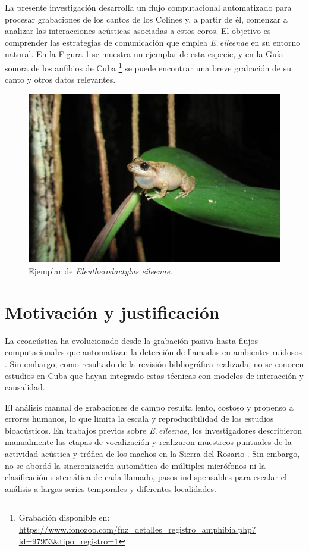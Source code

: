 La presente investigación desarrolla un flujo computacional automatizado para 
procesar grabaciones de los cantos de los Colines y, a partir de él, comenzar a analizar 
 las interacciones acústicas asociadas a estos coros. 
El objetivo es comprender las 
estrategias de comunicación que emplea \emph{E.\,eileenae} en su entorno natural.
En la Figura \ref{fig:colin} se muestra un ejemplar de esta especie, y en la
Guía sonora de los anfibios de Cuba 
\footnote{Grabación disponible en: \url{https://www.fonozoo.com/fnz_detalles_registro_amphibia.php?id=97953&tipo_registro=1}}
se puede encontrar una breve grabación de su canto y otros datos relevantes.\\

\begin{figure}[ht]
    \centering
    \includegraphics[width=\columnwidth]{Graphics/colin.jpg}
    \caption{Ejemplar de \emph{Eleutherodactylus eileenae}.}
    \label{fig:colin}
\end{figure}


\section{Motivación y justificación}
\label{sec:motivacion_justificacion}

La ecoacústica ha evolucionado desde la grabación pasiva hasta flujos computacionales 
que automatizan la detección de llamadas en ambientes ruidosos 
\cite{acevedo2009automated,blumstein2011acoustic}. Sin embargo, 
como resultado de la revisión bibliográfica realizada, no se conocen
estudios en Cuba que   
hayan integrado estas técnicas con modelos de interacción y causalidad.

El análisis manual de grabaciones de campo resulta lento, 
costoso y propenso a errores humanos, lo que limita la escala y 
reproducibilidad de los estudios bioacústicos. En trabajos 
previos sobre \emph{E.\,eileenae}, los investigadores 
describieron manualmente las etapas de vocalización y 
realizaron muestreos puntuales de la actividad acústica y 
trófica de los machos en la Sierra del Rosario \cite{alonso2001patrones}. 
Sin embargo, no se abordó la sincronización automática de 
múltiples micrófonos ni la clasificación sistemática de cada 
llamado, pasos indispensables para escalar el análisis a largas 
series temporales y diferentes localidades.

